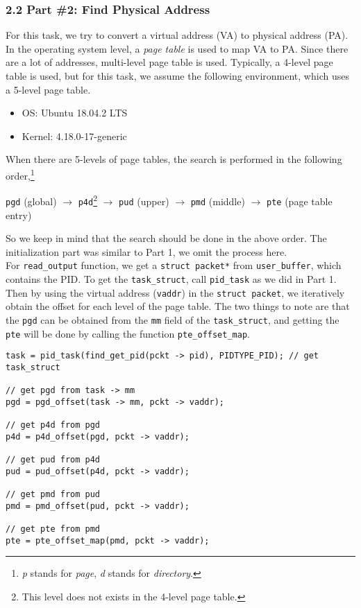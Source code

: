 \documentclass[12pt]{report}
\begin{document}
\subsubsection*{2.2 Part \#2: Find Physical Address}
For this task, we try to convert a virtual address (VA) to physical address (PA). In the operating system level, a \textit{page table} is used to map VA to PA. Since there are a lot of addresses, multi-level page table is used. Typically, a 4-level page table is used, but for this task, we assume the following environment, which uses a 5-level page table.
\begin{itemize}
	\item OS: Ubuntu 18.04.2 LTS
	\item Kernel: 4.18.0-17-generic 
\end{itemize}
When there are 5-levels of page tables, the search is performed in the following order,\footnote{\textit{p} stands for \textit{page}, \textit{d} stands for \textit{directory}.}
\begin{center}
	\texttt{pgd} (global) $\rightarrow$ \texttt{p4d}\footnote{This level does not exists in the 4-level page table.} $\rightarrow$ \texttt{pud} (upper) $\rightarrow$ \texttt{pmd} (middle) $\rightarrow$ \texttt{pte} (page table entry)
\end{center}
So we keep in mind that the search should be done in the above order. The initialization part was similar to Part 1, we omit the process here.\\
For \texttt{read\_output} function, we get a \texttt{struct packet*} from \texttt{user\_buffer}, which contains the PID. To get the \texttt{task\_struct}, call \texttt{pid\_task} as we did in Part 1. Then by using the virtual address (\texttt{vaddr}) in the \texttt{struct packet}, we iteratively obtain the offset for each level of the page table. The two things to note are that the \texttt{pgd} can be obtained from the \texttt{mm} field of the \texttt{task\_struct}, and getting the \texttt{pte} will be done by calling the function \texttt{pte\_offset\_map}.
\begin{lstlisting}[style=Cstyle]
task = pid_task(find_get_pid(pckt -> pid), PIDTYPE_PID); // get task_struct

// get pgd from task -> mm
pgd = pgd_offset(task -> mm, pckt -> vaddr);

// get p4d from pgd
p4d = p4d_offset(pgd, pckt -> vaddr);

// get pud from p4d
pud = pud_offset(p4d, pckt -> vaddr);

// get pmd from pud
pmd = pmd_offset(pud, pckt -> vaddr);

// get pte from pmd
pte = pte_offset_map(pmd, pckt -> vaddr);
\end{lstlisting}
\end{document}
